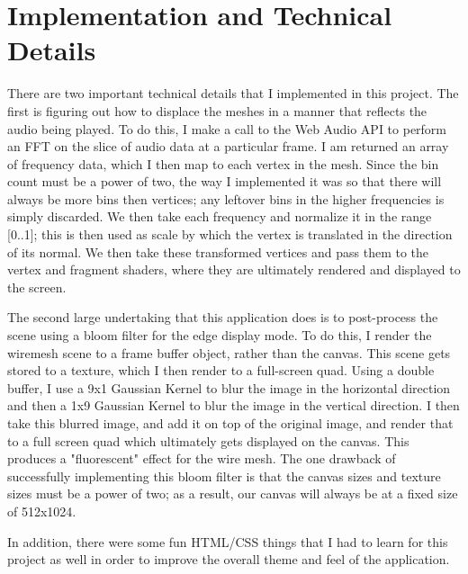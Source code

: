 \documentclass[12pt]{article}
\begin{document}
\section{Implementation and Technical Details}
There are two important technical details that I implemented in this project. The first is figuring out how to displace the meshes in a manner that reflects the audio being played. To do this, I make a call to the Web Audio API to perform an FFT on the slice of audio data at a particular frame. I am returned an array of frequency data, which I then map to each vertex in the mesh. Since the bin count must be a power of two, the way I implemented it was so that there will always be more bins then vertices; any leftover bins in the higher frequencies is simply discarded. We then take each frequency and normalize it in the range [0..1]; this is then used as scale by which the vertex is translated in the direction of its normal. We then take these transformed vertices and pass them to the vertex and fragment shaders, where they are ultimately rendered and displayed to the screen.

The second large undertaking that this application does is to post-process the scene using a bloom filter for the edge display mode. To do this, I render the wiremesh scene to a frame buffer object, rather than the canvas. This scene gets stored to a texture, which I then render to a full-screen quad. Using a double buffer, I use a 9x1 Gaussian Kernel to blur the image in the horizontal direction and then a 1x9 Gaussian Kernel to blur the image in the vertical direction. I then take this blurred image, and add it on top of the original image, and render that to a full screen quad which ultimately gets displayed on the canvas. This produces a "fluorescent" effect for the wire mesh. The one drawback of successfully implementing this bloom filter is that the canvas sizes and texture sizes must be a power of two; as a result, our canvas will always be at a fixed size of 512x1024. 

In addition, there were some fun HTML/CSS things that I had to learn for this project as well in order to improve the overall theme and feel of the application. 
\end{document}
